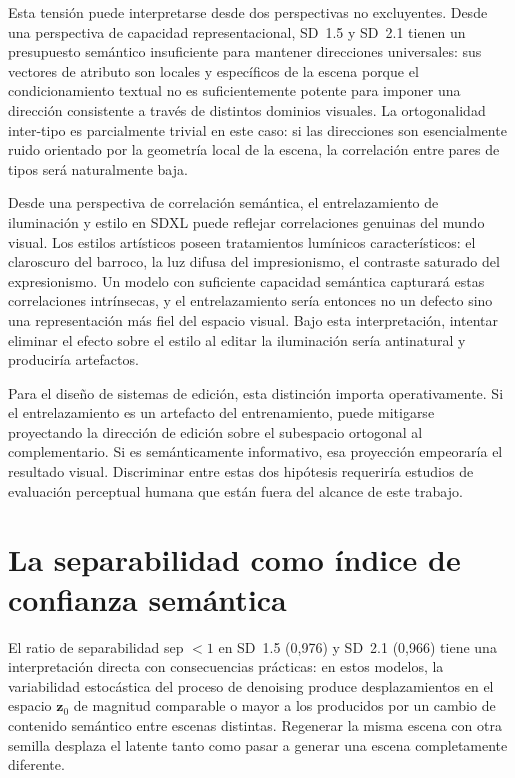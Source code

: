 \documentclass[12pt, a4paper, twoside]{book}
\newcommand{\z}{\mathbf{z}}
\begin{document}
Esta tensión puede interpretarse desde dos perspectivas no excluyentes. Desde una perspectiva de capacidad representacional, SD~1.5 y SD~2.1 tienen un presupuesto semántico insuficiente para mantener direcciones universales: sus vectores de atributo son locales y específicos de la escena porque el condicionamiento textual no es suficientemente potente para imponer una dirección consistente a través de distintos dominios visuales. La ortogonalidad inter-tipo es parcialmente trivial en este caso: si las direcciones son esencialmente ruido orientado por la geometría local de la escena, la correlación entre pares de tipos será naturalmente baja.

Desde una perspectiva de correlación semántica, el entrelazamiento de iluminación y estilo en SDXL puede reflejar correlaciones genuinas del mundo visual. Los estilos artísticos poseen tratamientos lumínicos característicos: el claroscuro del barroco, la luz difusa del impresionismo, el contraste saturado del expresionismo. Un modelo con suficiente capacidad semántica capturará estas correlaciones intrínsecas, y el entrelazamiento sería entonces no un defecto sino una representación más fiel del espacio visual. Bajo esta interpretación, intentar eliminar el efecto sobre el estilo al editar la iluminación sería antinatural y produciría artefactos.

Para el diseño de sistemas de edición, esta distinción importa operativamente. Si el entrelazamiento es un artefacto del entrenamiento, puede mitigarse proyectando la dirección de edición sobre el subespacio ortogonal al complementario. Si es semánticamente informativo, esa proyección empeoraría el resultado visual. Discriminar entre estas dos hipótesis requeriría estudios de evaluación perceptual humana que están fuera del alcance de este trabajo.

\section{La separabilidad como índice de confianza semántica}
\label{sec:dis:separabilidad}

El ratio de separabilidad sep $< 1$ en SD~1.5 (0,976) y SD~2.1 (0,966) tiene una interpretación directa con consecuencias prácticas: en estos modelos, la variabilidad estocástica del proceso de denoising produce desplazamientos en el espacio $\z_0$ de magnitud comparable o mayor a los producidos por un cambio de contenido semántico entre escenas distintas. Regenerar la misma escena con otra semilla desplaza el latente tanto como pasar a generar una escena completamente diferente.
\end{document}
